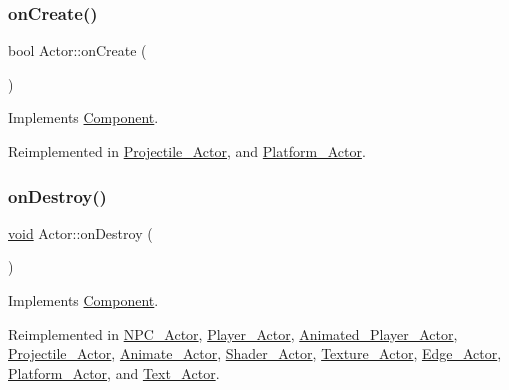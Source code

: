 \mbox{\label{classActor_a56a241c949adf52cedceb45a7102ea1a}} 
\subsubsection{\texorpdfstring{on\+Create()}{onCreate()}}
{\footnotesize\ttfamily bool Actor\+::on\+Create (\begin{DoxyParamCaption}{ }\end{DoxyParamCaption})\hspace{0.3cm}{\ttfamily [virtual]}}



Implements \hyperlink{classComponent_a3a1537a8b8bcdb2155afbb925c77b0a2}{Component}.



Reimplemented in \hyperlink{classProjectile__Actor_a98e2e2198cd164c35318c04f96e6a3ac}{Projectile\+\_\+\+Actor}, and \hyperlink{classPlatform__Actor_ab902e2540f1d3127dedff632841b4921}{Platform\+\_\+\+Actor}.

\mbox{\label{classActor_a47101d6275509662bf6c84c3f3439696}} 
\subsubsection{\texorpdfstring{on\+Destroy()}{onDestroy()}}
{\footnotesize\ttfamily \hyperlink{imgui__impl__opengl3__loader_8h_ac668e7cffd9e2e9cfee428b9b2f34fa7}{void} Actor\+::on\+Destroy (\begin{DoxyParamCaption}{ }\end{DoxyParamCaption})\hspace{0.3cm}{\ttfamily [virtual]}}



Implements \hyperlink{classComponent_a2b198f27162a6caf63917e304295f892}{Component}.



Reimplemented in \hyperlink{classNPC__Actor_ab274d0517bd0cd710efc7df31cd7450b}{N\+P\+C\+\_\+\+Actor}, \hyperlink{classPlayer__Actor_a200b6b956d9c597cbc626ca9bcafb25e}{Player\+\_\+\+Actor}, \hyperlink{classAnimated__Player__Actor_ac6c4259340bfa000195b69f7eef1ae17}{Animated\+\_\+\+Player\+\_\+\+Actor}, \hyperlink{classProjectile__Actor_a58d01ff77f0815ca611236f139b7aafa}{Projectile\+\_\+\+Actor}, \hyperlink{classAnimate__Actor_ae67ff6399f3d46696f84c77b2e519ead}{Animate\+\_\+\+Actor}, \hyperlink{classShader__Actor_a16f7f5f30d3f3cd125de9713457a7db2}{Shader\+\_\+\+Actor}, \hyperlink{classTexture__Actor_ac9677f60df27e14ef3550ae2b0678ad5}{Texture\+\_\+\+Actor}, \hyperlink{classEdge__Actor_ae7a429d48b86442154c93eb65bc8b22d}{Edge\+\_\+\+Actor}, \hyperlink{classPlatform__Actor_a34b915aa583cdf659ec29368b6feb7e8}{Platform\+\_\+\+Actor}, and \hyperlink{classText__Actor_af9b25da889aad4aec6f17671c37ac431}{Text\+\_\+\+Actor}.

